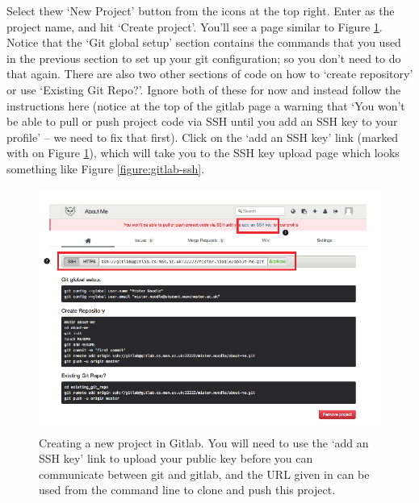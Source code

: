 Select thew `New Project' button from the icons at the top right. Enter  as the project name, and hit `Create project'. You'll see a page similar to Figure \ref{figure:gitlab-new-project}. Notice that the `Git global setup' section contains the commands that you used in the previous section to set up your git configuration; so you don't need to do that again. There are also two other sections of code on how to `create repository' or use `Existing Git Repo?'. Ignore both of these for now and instead follow the instructions here (notice at the top of the gitlab page a warning that `You won't be able to pull or push project code via SSH until you add an SSH key to your profile' -- we need to fix that first). Click on the `add an SSH key' link (marked with \protect{} on Figure \ref{figure:gitlab-new-project}), which will take you to the SSH key upload page which looks something like Figure \ref{figure:gitlab-ssh}.

\begin{figure}
\centerline{\includegraphics[width=15cm]{images/gitlab-new-project}}
\caption{Creating a new project in Gitlab. \protect{} You will need to use the  `add an SSH key' link to upload your public key before you can communicate between git and gitlab, and the URL given in \protect{} can be used from the command line to clone and push this project.}\label{figure:gitlab-new-project}
\end{figure}

